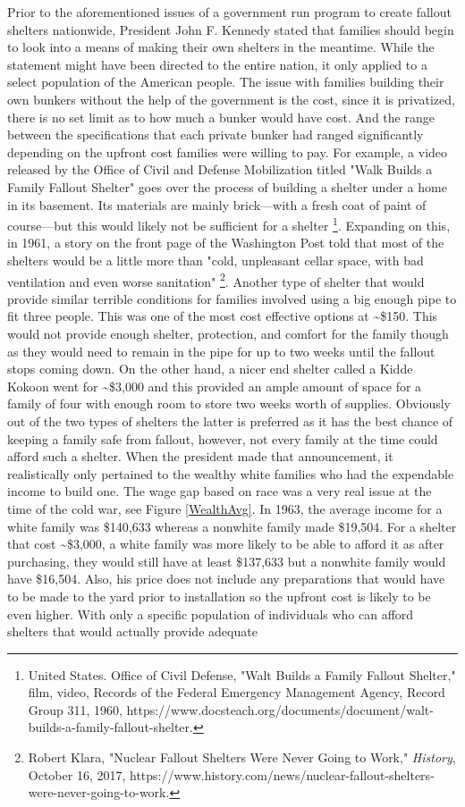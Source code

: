 \documentclass[12pt]{turabian-researchpaper}
\begin{document}
Prior to the aforementioned issues of a government run program to create fallout shelters nationwide, President John F. Kennedy stated that families should begin to look into a means of making their own shelters in the meantime. While the statement might have been directed to the entire nation, it only applied to a select population of the American people. The issue with families building their own bunkers without the help of the government is the cost, since it is privatized, there is no set limit as to how much a bunker would have cost. And the range between the specifications that each private bunker had ranged significantly depending on the upfront cost families were willing to pay. For example, a video released by the Office of Civil and Defense Mobilization titled "Walk Builds a Family Fallout Shelter" goes over the process of building a shelter under a home in its basement. Its materials are mainly brick—with a fresh coat of paint of course—but this would likely not be sufficient for a shelter \footnote{United States. Office of Civil Defense, "Walt Builds a Family Fallout Shelter," film, video, Records of the Federal Emergency Management Agency, Record Group 311, 1960, https://www.docsteach.org/documents/document/walt-builds-a-family-fallout-shelter.}. Expanding on this, in 1961, a story on the front page of the Washington Post told that most of the shelters would be a little more than "cold, unpleasant cellar space, with bad ventilation and even worse sanitation" \footnote{Robert Klara, "Nuclear Fallout Shelters Were Never Going to Work," \textit{History}, October 16, 2017, https://www.history.com/news/nuclear-fallout-shelters-were-never-going-to-work.}. Another type of shelter that would provide similar terrible conditions for families involved using a big enough pipe to fit three people. This was one of the most cost effective options at \textasciitilde \$150. This would not provide enough shelter, protection, and comfort for the family though as they would need to remain in the pipe for up to two weeks until the fallout stops coming down. On the other hand, a nicer end shelter called a Kidde Kokoon went for \textasciitilde \$3,000 and this provided an ample amount of space for a family of four with enough room to store two weeks worth of supplies. Obviously out of the two types of shelters the latter is preferred as it has the best chance of keeping a family safe from fallout, however, not every family at the time could afford such a shelter. When the president made that announcement, it realistically only pertained to the wealthy white families who had the expendable income to build one. The wage gap based on race was a very real issue at the time of the cold war, see Figure \ref{WealthAvg}. In 1963, the average income for a white family was \$140,633 whereas a nonwhite family made \$19,504. For a shelter that cost \textasciitilde \$3,000, a white family was more likely to be able to afford it as after purchasing, they would still have at least \$137,633 but a nonwhite family would have \$16,504. Also, his price does not include any preparations that would have to be made to the yard prior to installation so the upfront cost is likely to be even higher. With only a specific population of individuals who can afford shelters that would actually provide adequate 
\end{document}
